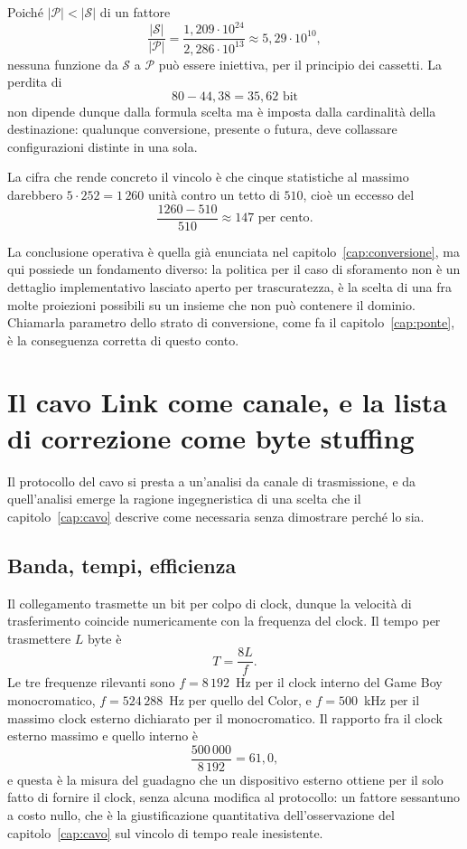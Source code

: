 Poiché $|\mathcal{P}| < |\mathcal{S}|$ di un fattore
\[
\frac{|\mathcal{S}|}{|\mathcal{P}|} = \frac{1{,}209 \cdot 10^{24}}{2{,}286 \cdot 10^{13}} \approx 5{,}29 \cdot 10^{10},
\]
nessuna funzione da $\mathcal{S}$ a $\mathcal{P}$ può essere iniettiva, per il principio dei cassetti. La perdita di
\[
80 - 44{,}38 = 35{,}62 \text{ bit}
\]
non dipende dunque dalla formula scelta ma è imposta dalla cardinalità della destinazione: qualunque conversione, presente o futura, deve collassare configurazioni distinte in una sola.

La cifra che rende concreto il vincolo è che cinque statistiche al massimo darebbero $5 \cdot 252 = 1\,260$ unità contro un tetto di $510$, cioè un eccesso del
\[
\frac{1260 - 510}{510} \approx 147 \text{ per cento}.
\]

La conclusione operativa è quella già enunciata nel capitolo~\ref{cap:conversione}, ma qui possiede un fondamento diverso: la politica per il caso di sforamento non è un dettaglio implementativo lasciato aperto per trascuratezza, è la scelta di una fra molte proiezioni possibili su un insieme che non può contenere il dominio. Chiamarla parametro dello strato di conversione, come fa il capitolo~\ref{cap:ponte}, è la conseguenza corretta di questo conto.

\section{Il cavo Link come canale, e la lista di correzione come byte stuffing}

Il protocollo del cavo si presta a un'analisi da canale di trasmissione, e da quell'analisi emerge la ragione ingegneristica di una scelta che il capitolo~\ref{cap:cavo} descrive come necessaria senza dimostrare perché lo sia.

\subsection{Banda, tempi, efficienza}

Il collegamento trasmette un bit per colpo di clock, dunque la velocità di trasferimento coincide numericamente con la frequenza del clock. Il tempo per trasmettere $L$ byte è
\[
T = \frac{8L}{f}.
\]
Le tre frequenze rilevanti sono $f = 8\,192$~Hz per il clock interno del Game Boy monocromatico, $f = 524\,288$~Hz per quello del Color, e $f = 500$~kHz per il massimo clock esterno dichiarato per il monocromatico. Il rapporto fra il clock esterno massimo e quello interno è
\[
\frac{500\,000}{8\,192} = 61{,}0,
\]
e questa è la misura del guadagno che un dispositivo esterno ottiene per il solo fatto di fornire il clock, senza alcuna modifica al protocollo: un fattore sessantuno a costo nullo, che è la giustificazione quantitativa dell'osservazione del capitolo~\ref{cap:cavo} sul vincolo di tempo reale inesistente.

